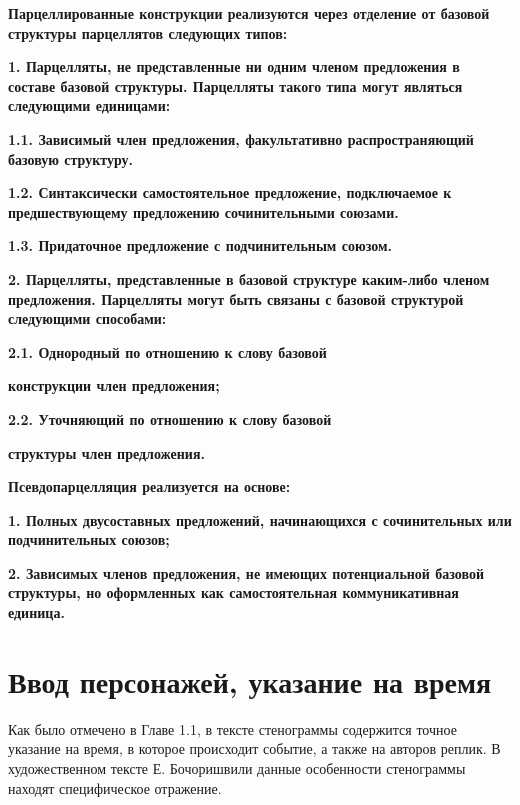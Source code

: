 \documentclass{kursa4}
\begin{document}
      {\bfseries\color[rgb]{0.2,0.2,0.2}
      \textmd{}Парцеллированные конструкции\textmd{ }\textmd{реализуются через отделение от базовой структуры парцеллятов следующих типов}\textmd{:}}

      {\bfseries\color[rgb]{0.2,0.2,0.2}
      \textmd{}\textmd{1. Парцелляты, не представленные ни одним членом предложения в составе базовой структуры. Парцелляты такого типа могут являться следующими единицами:}}

      {\bfseries\color[rgb]{0.2,0.2,0.2}
      \textmd{1.1. Зависимый член предложения, факультативно распространяющий базовую структуру.}}

      {\bfseries\color[rgb]{0.2,0.2,0.2}
      \textmd{1.2. }\textmd{Синтаксически самостоятельное предложение, подключаемое к предшествующему предложению сочинительными союзами.}}

      {\bfseries\color[rgb]{0.2,0.2,0.2}
      \textmd{1.3. Придаточное предложение с подчинительным союзом.}}

      {\bfseries\color[rgb]{0.2,0.2,0.2}
      \textmd{2. Парцелляты, представленные в базовой структуре каким-либо членом предложения. Парцелляты могут быть связаны с базовой структурой следующими способами:}}

      {\bfseries\color[rgb]{0.2,0.2,0.2}
      \textmd{2.1. Однородный по отношению к слову базовой}}

      {\bfseries\color[rgb]{0.2,0.2,0.2}
      \textmd{конструкции член предложения;}}

      {\bfseries\color[rgb]{0.2,0.2,0.2}
      \textmd{2.2. Уточняющий по отношению к слову базовой}}

      {\bfseries\color[rgb]{0.2,0.2,0.2}
      \textmd{структуры член предложения.}}

      {\bfseries\color[rgb]{0.2,0.2,0.2}
      \textmd{}Псевдопарцелляция\textmd{ реализуется на основе:}}

      {\bfseries\color[rgb]{0.2,0.2,0.2}
      \textmd{1. }\textmd{Полных двусоставных п}\textmd{редложений, начинающихся с сочинительных или подчинительных союзов;}}

      {\bfseries\color[rgb]{0.2,0.2,0.2}
      \textmd{2. }\textmd{Зависимых членов предложения, }\textmd{не имеющих потенциальной базовой структуры, }\textmd{но оформленных как самостоятельная коммуникативная единица. }}




    \section{Ввод персонажей, указание на время}   
      Как было отмечено в Главе 1.1, в тексте стенограммы содержится точное указание на время, в которое происходит событие, а также на авторов реплик. В художественном тексте Е. Бочоришвили данные особенности стенограммы находят специфическое отражение. 
\end{document}
